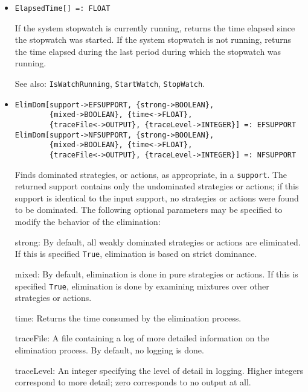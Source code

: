 \begin{itemize}

\item{}
\protect \large \begin{verbatim}
ElapsedTime[] =: FLOAT
\end{verbatim}\normalsize

\bd
If the system stopwatch is currently running, returns the
time elapsed since the stopwatch was started.  If the system stopwatch
is not running, returns the time elapsed during the last period during which
the stopwatch was running.
\item
[See also:] \verb+IsWatchRunning+, \verb+StartWatch+, \verb+StopWatch+.
\ed

\item{}
\protect \large \begin{verbatim}
ElimDom[support->EFSUPPORT, {strong->BOOLEAN},
        {mixed->BOOLEAN}, {time<->FLOAT},
        {traceFile<->OUTPUT}, {traceLevel->INTEGER}] =: EFSUPPORT
ElimDom[support->NFSUPPORT, {strong->BOOLEAN},
        {mixed->BOOLEAN}, {time<->FLOAT},
        {traceFile<->OUTPUT}, {traceLevel->INTEGER}] =: NFSUPPORT
\end{verbatim}\normalsize

\bd
Finds dominated strategies, or actions, as appropriate, in a 
\verb+support+.  The returned support contains only the undominated
strategies or actions; if this support is identical to the input support,
no strategies or actions were found to be dominated.  The following
optional parameters may be specified to modify the behavior of
the elimination:

\bd
\item [strong:] By default, all weakly dominated strategies or actions
are eliminated.  If this is specified \verb+True+, elimination is based
on strict dominance.
\item [mixed:] By default, elimination is done in pure strategies or
actions.  If this is specified \verb+True+, elimination is done by
examining mixtures over other strategies or actions.
\item [time:] Returns the time consumed by the elimination process.
\item [traceFile:] A file containing a log of more detailed information
on the elimination process.  By default, no logging is done.
\item [traceLevel:] An integer specifying the level of detail in logging.
Higher integers correspond to more detail; zero corresponds to no output
at all.
\ed
\ed


\end{itemize}
